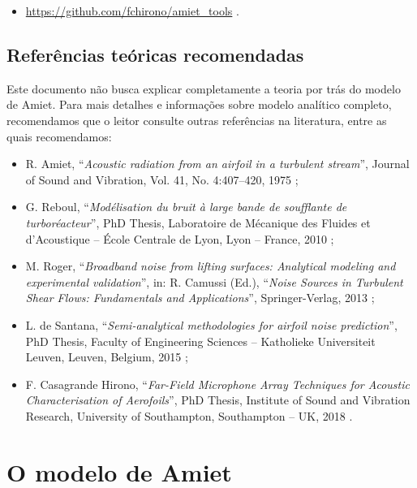 \documentclass[a4paper, 11pt, twoside]{article}
\begin{document}
\begin{itemize}
	\item \url{https://github.com/fchirono/amiet_tools} .
\end{itemize}


\subsection{Referências teóricas recomendadas}

Este documento não busca explicar completamente a teoria por trás do modelo de Amiet. Para mais detalhes e informações sobre modelo analítico completo, recomendamos que o leitor consulte outras referências na literatura, entre as quais recomendamos:

\begin{itemize}
	\item R. Amiet, ``\emph{Acoustic radiation from an airfoil in a turbulent stream}'', Journal of Sound and Vibration, Vol. 41, No. 4:407–420, 1975 \cite{Amiet75};
	
	\item G. Reboul, ``\emph{Modélisation du bruit à large bande de soufflante de turboréacteur}'', PhD Thesis, Laboratoire de Mécanique des Fluides et d’Acoustique -- École Centrale de Lyon, Lyon -- France, 2010 \cite{Reboul10};
	
	\item M. Roger, ``\emph{Broadband noise from lifting surfaces: Analytical modeling and experimental validation}'', in: R. Camussi (Ed.), ``\emph{Noise Sources in Turbulent Shear Flows: Fundamentals and Applications}'', Springer-Verlag, 2013 \cite{Roger13};
	
	\item L. de Santana, ``\emph{Semi-analytical methodologies for airfoil noise prediction}'', PhD Thesis, Faculty of Engineering Sciences -- Katholieke Universiteit Leuven, Leuven, Belgium, 2015 \cite{deSantana2015};
	
	\item F. Casagrande Hirono, ``\emph{Far-Field Microphone Array Techniques for Acoustic Characterisation of Aerofoils}'', PhD Thesis, Institute of Sound and Vibration Research, University of Southampton, Southampton -- UK, 2018 \cite{Casagrande18}.
\end{itemize}

\clearpage
\newpage
\section{O modelo de Amiet}
\end{document}
